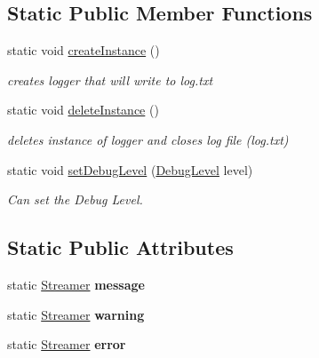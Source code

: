 \subsection*{Static Public Member Functions}
\begin{DoxyCompactItemize}
\item 
\hypertarget{class_logger_a954e6c1004836f9976c6b5baca2f1b20}{}static void \hyperlink{class_logger_a954e6c1004836f9976c6b5baca2f1b20}{create\+Instance} ()\label{class_logger_a954e6c1004836f9976c6b5baca2f1b20}

\begin{DoxyCompactList}\small\item\em creates logger that will write to log.\+txt \end{DoxyCompactList}\item 
\hypertarget{class_logger_a391561c3919714ba6b4cab9b1f4d2b4d}{}static void \hyperlink{class_logger_a391561c3919714ba6b4cab9b1f4d2b4d}{delete\+Instance} ()\label{class_logger_a391561c3919714ba6b4cab9b1f4d2b4d}

\begin{DoxyCompactList}\small\item\em deletes instance of logger and closes log file (\textquotesingle{}log.\+txt\textquotesingle{}) \end{DoxyCompactList}\item 
\hypertarget{class_logger_a2b19c46b5c7a9abc0a6c1ac8c8dc6a58}{}static void \hyperlink{class_logger_a2b19c46b5c7a9abc0a6c1ac8c8dc6a58}{set\+Debug\+Level} (\hyperlink{class_logger_a96ecc57d01700c7b14d101f0f65a9932}{Debug\+Level} level)\label{class_logger_a2b19c46b5c7a9abc0a6c1ac8c8dc6a58}

\begin{DoxyCompactList}\small\item\em Can set the Debug Level. \end{DoxyCompactList}\end{DoxyCompactItemize}
\subsection*{Static Public Attributes}
\begin{DoxyCompactItemize}
\item 
\hypertarget{class_logger_ab6dbf1eed1ee5d44a9b75d879dc4df73}{}static \hyperlink{class_logger_1_1_streamer}{Streamer} {\bfseries message}\label{class_logger_ab6dbf1eed1ee5d44a9b75d879dc4df73}

\item 
\hypertarget{class_logger_a3274d8d839cce1cf1a7788149ca9e049}{}static \hyperlink{class_logger_1_1_streamer}{Streamer} {\bfseries warning}\label{class_logger_a3274d8d839cce1cf1a7788149ca9e049}

\item 
\hypertarget{class_logger_ac5e21aab8350a97a4749e116be6ee268}{}static \hyperlink{class_logger_1_1_streamer}{Streamer} {\bfseries error}\label{class_logger_ac5e21aab8350a97a4749e116be6ee268}

\end{DoxyCompactItemize}
